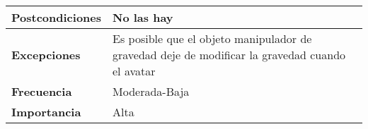 \begin{longtable}{l|l}
\begin{minipage}{0.25\columnwidth}
\textbf{Postcondiciones} 
\end{minipage}
&
\begin{minipage}{0.65\columnwidth}
No las hay
\end{minipage}
\\ \hline

\begin{minipage}{0.25\columnwidth}
\textbf{Excepciones} 
\end{minipage}
&
\begin{minipage}{0.65\columnwidth}
Es posible que el objeto manipulador de gravedad deje de modificar la gravedad cuando el avatar 
\end{minipage}
\\ \hline

\begin{minipage}{0.25\columnwidth}
\textbf{Frecuencia} 
\end{minipage}
&
\begin{minipage}{0.65\columnwidth}
Moderada-Baja
\end{minipage}
\\ \hline

\begin{minipage}{0.25\columnwidth}
\textbf{Importancia} 
\end{minipage}
&
\begin{minipage}{0.65\columnwidth}
Alta
\end{minipage}
\\ \hline
\end{longtable}

